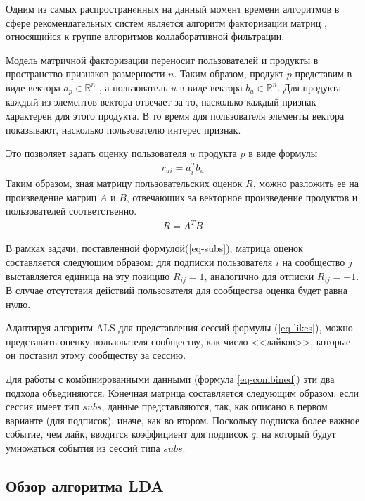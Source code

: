 \documentclass[times,specification,annotation]{itmo-student-thesis}
\begin{document}
Одним из самых распространeнных на данный момент времени алгоритмов в сфере рекомендательных систем является алгоритм факторизации матриц \cite{koren2009}, относящийся к группе алгоритмов коллаборативной фильтрации.

Модель матричной факторизации переносит пользователей и продукты в пространство признаков размерности $n$. Таким образом, продукт $p$ представим в виде вектора $a_{p} \in \mathbb{R}^n$ , а пользователь $u$ в виде вектора $b_{u} \in \mathbb{R}^n$. Для продукта каждый из элементов вектора отвечает за то, насколько каждый признак характерен для  этого продукта. В то время для пользователя элементы вектора показывают, насколько пользователю интерес признак.

Это позволяет задать оценку пользователя $u$ продукта $p$ в виде формулы
 \begin{align*}
r_{ui} = a_{i}^{T}b_{u}
\end{align*}
Таким образом, зная матрицу пользовательских оценок $R$, можно разложить ее на произведение матриц $A$ и $B$, отвечающих за векторное произведение продуктов и пользователей соответственно.
 \begin{align*}
R = A^TB
\end{align*}

В рамках задачи, поставленной формулой(\ref{eq-subs}), матрица оценок составляется следующим образом: для подписки пользователя $i$ на сообщество $j$ выставляется единица на эту позицию $R_{ij} = 1$, аналогично для отписки $R_{ij} = - 1$. В случае отсутствия действий пользователя для сообщества оценка будет равна нулю.

Адаптируя алгоритм ALS \cite{koren2009} для представления сессий формулы (\ref{eq-likes}), можно представить оценку пользователя сообществу, как число <<лайков>>, которые он поставил этому сообществу за сессию.

Для работы с комбинированными данными (формула \ref{eq-combined}) эти два подхода объединяются. Конечная матрица составляется следующим образом: если сессия имеет тип $subs$, данные представляются, так, как описано в первом варианте (для подписок), иначе, как во втором. Поскольку подписка более важное событие, чем лайк, вводится коэффициент для подписок $q$, на который будут умножаться события из сессий типа $subs$.   

\subsection{Обзор алгоритма LDA}\label{sec:lda}
\end{document}
